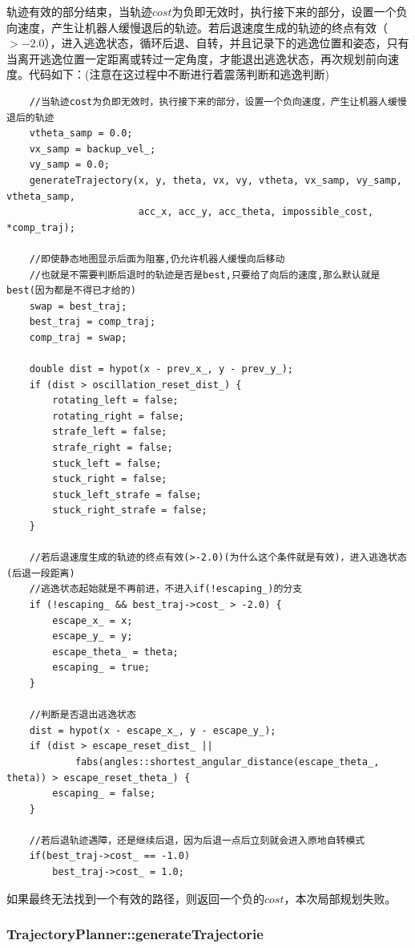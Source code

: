 \documentclass[9pt, oneside]{book}
\begin{document}
轨迹有效的部分结束，当轨迹$cost$为负即无效时，执行接下来的部分，设置一个负向速度，产生让机器人缓慢退后的轨迹。若后退速度生成的轨迹的终点有效（$> -2.0$），进入逃逸状态，循环后退、自转，并且记录下的逃逸位置和姿态，只有当离开逃逸位置一定距离或转过一定角度，才能退出逃逸状态，再次规划前向速度。代码如下：(注意在这过程中不断进行着震荡判断和逃逸判断)

\footnotesize
\begin{verbatim}
    //当轨迹cost为负即无效时，执行接下来的部分，设置一个负向速度，产生让机器人缓慢退后的轨迹
    vtheta_samp = 0.0;
    vx_samp = backup_vel_;
    vy_samp = 0.0;
    generateTrajectory(x, y, theta, vx, vy, vtheta, vx_samp, vy_samp, vtheta_samp,
                       acc_x, acc_y, acc_theta, impossible_cost, *comp_traj);

    //即使静态地图显示后面为阻塞,仍允许机器人缓慢向后移动
    //也就是不需要判断后退时的轨迹是否是best,只要给了向后的速度,那么默认就是best(因为都是不得已才给的)
    swap = best_traj;
    best_traj = comp_traj;
    comp_traj = swap;

    double dist = hypot(x - prev_x_, y - prev_y_);
    if (dist > oscillation_reset_dist_) {
        rotating_left = false;
        rotating_right = false;
        strafe_left = false;
        strafe_right = false;
        stuck_left = false;
        stuck_right = false;
        stuck_left_strafe = false;
        stuck_right_strafe = false;
    }

    //若后退速度生成的轨迹的终点有效(>-2.0)(为什么这个条件就是有效)，进入逃逸状态(后退一段距离)
    //逃逸状态起始就是不再前进，不进入if(!escaping_)的分支
    if (!escaping_ && best_traj->cost_ > -2.0) {
        escape_x_ = x;
        escape_y_ = y;
        escape_theta_ = theta;
        escaping_ = true;
    }

    //判断是否退出逃逸状态
    dist = hypot(x - escape_x_, y - escape_y_);
    if (dist > escape_reset_dist_ ||
            fabs(angles::shortest_angular_distance(escape_theta_, theta)) > escape_reset_theta_) {
        escaping_ = false;
    }

    //若后退轨迹遇障，还是继续后退，因为后退一点后立刻就会进入原地自转模式
    if(best_traj->cost_ == -1.0)
        best_traj->cost_ = 1.0;
\end{verbatim}
\normalsize

如果最终无法找到一个有效的路径，则返回一个负的$cost$，本次局部规划失败。

\subsubsection{TrajectoryPlanner::generateTrajectorie}
\end{document}
